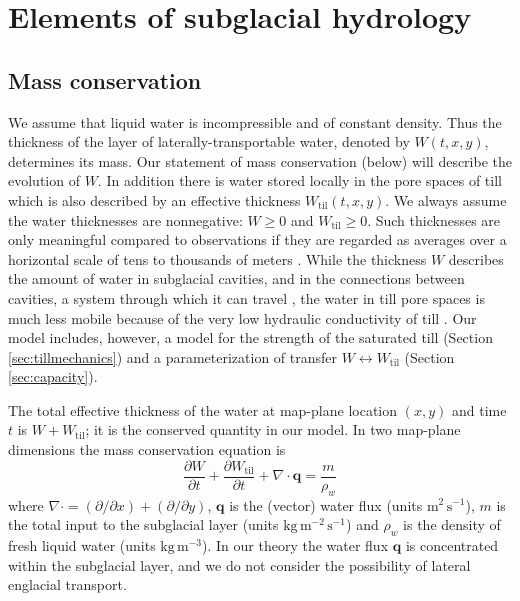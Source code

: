 \documentclass[gmd]{copernicus}   %
\newcommand{\text}{\textrm}
\newcommand\bq{\mathbf{q}}
\newcommand{\Div}{\nabla\cdot}
\newcommand{\Wtil}{W_{\text{til}}}
\begin{document}
\section{Elements of subglacial hydrology} \label{sec:elements}

\subsection{Mass conservation}  We assume that liquid water is incompressible and of constant density.  Thus the thickness of the layer of laterally-transportable water, denoted by $W(t,x,y)$, determines its mass.  Our statement of mass conservation (below) will describe the evolution of $W$.  In addition there is water stored locally in the pore spaces of till \citep{Tulaczyketal2000b} which is also described by an effective thickness $\Wtil(t,x,y)$.  We always assume the water thicknesses are nonnegative: $W \ge 0$ and $\Wtil \ge 0$.  Such thicknesses are only meaningful compared to observations if they are regarded as averages over a horizontal scale of tens to thousands of meters \citep{FlowersClarke2002_theory}.  While the thickness $W$ describes the amount of water in subglacial cavities, and in the connections between cavities, a system through which it can travel \citep{Kamb1987}, the water in till pore spaces is much less mobile because of the very low hydraulic conductivity of till \citep{TrufferEchelmeyerHarrison2001,Tulaczyketal2000}.  Our model includes, however, a model for the strength of the saturated till (Section \ref{sec:tillmechanics}) and a parameterization of transfer $W \leftrightarrow \Wtil$ (Section \ref{sec:capacity}).

The total effective thickness of the water at map-plane location $(x,y)$ and time $t$ is $W + \Wtil$; it is the conserved quantity in our model.  In two map-plane dimensions the mass conservation equation is \citep[compare][]{Clarke05}
\begin{equation} \label{eq:conserve}
\frac{\partial W}{\partial t} + \frac{\partial \Wtil}{\partial t} + \Div \bq = \frac{m}{\rho_w}
\end{equation}
where $\Div = (\partial/\partial x) + (\partial/\partial y)$, $\bq$ is the (vector) water flux (units $\text{m}^2\,\text{s}^{-1}$), $m$ is the total input to the subglacial layer (units $\text{kg}\,\text{m}^{-2}\,\text{s}^{-1}$) and $\rho_w$ is the density of fresh liquid water (units $\text{kg}\,\text{m}^{-3}$).  In our theory the water flux $\bq$ is concentrated within the subglacial layer, and we do not consider the possibility of lateral englacial transport.
\end{document}
